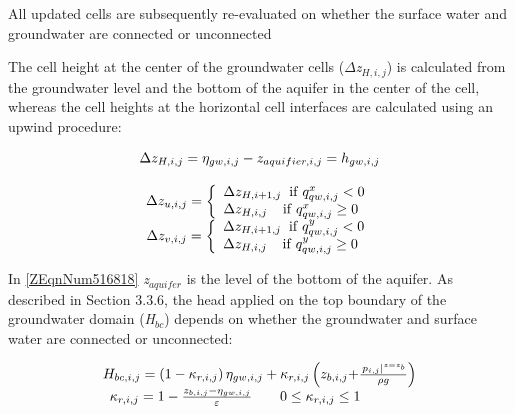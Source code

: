 \documentclass{article}
\begin{document}
\noindent All updated cells are subsequently re-evaluated on whether the surface water and groundwater are connected or unconnected

\noindent \eject \textit{}

\noindent The cell height at the center of the groundwater cells (\textit{$\Delta $z${}_{H,i,j}$}) is calculated from the groundwater level and the bottom of the aquifer in the center of the cell, whereas the cell heights at the horizontal cell interfaces are calculated using an upwind procedure:

\noindent 
\begin{equation} \label{ZEqnNum516818} 
\begin{array}{c} {\Delta z_{H,i,j} =\eta _{gw,i,j} -z_{aquifier,i,j} =h_{gw,i,j} } \\ {} \\ {\Delta z_{u,i,j} =\left\{\begin{array}{l} {\Delta z_{H,i+1,j} {\rm \; \; if\; }q_{qw,i,j}^{x} <0} \\ {\Delta z_{H,i,j} {\rm \; \; \; \; if\; }q_{qw,i,j}^{x} \ge 0} \end{array}\right. } \\ {\Delta z_{v,i,j} =\left\{\begin{array}{l} {\Delta z_{H,i+1,j} {\rm \; \; if\; }q_{qw,i,j}^{y} <0} \\ {\Delta z_{H,i,j} {\rm \; \; \; \; if\; }q_{qw,i,j}^{y} \ge 0} \end{array}\right. } \end{array} 
\end{equation} 


\noindent In \eqref{ZEqnNum516818} \textit{z${}_{aquifer}$} is the level of the bottom of the aquifer. As described in Section 3.3.6, the head applied on the top boundary of the groundwater domain (\textit{H${}_{bc}$}) depends on whether the groundwater and surface water are connected or unconnected:

\noindent 
\begin{equation} \label{ZEqnNum702689} 
\begin{array}{l} {H_{bc,i,j} =\left(1-\kappa _{r,i,j} \right)\eta _{gw,i,j} +\kappa _{r,i,j} \left(z_{b,i,j} {\rm +}\frac{\left. p_{i,j} \right|^{z=z_{b} } }{\rho g} \right)} \\ {\begin{array}{ccc} {\kappa _{r,i,j} =1-\frac{z_{b,i,j} -\eta _{gw,i,j} }{\varepsilon } } & {} & {0\le \kappa _{r,i,j} \le 1} \end{array}} \end{array} 
\end{equation} 
\end{document}
